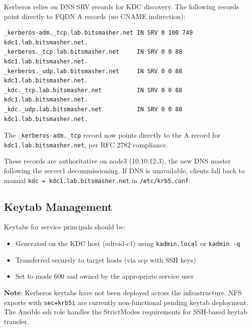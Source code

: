 Kerberos relies on DNS SRV records for KDC discovery. The following records point directly to FQDN A records (no CNAME indirection):

\begin{lstlisting}[style=mystyle]
_kerberos-adm._tcp.lab.bitsmasher.net IN SRV 0 100 749 kdc1.lab.bitsmasher.net.
_kerberos._tcp.lab.bitsmasher.net     IN SRV 0 0 88  kdc1.lab.bitsmasher.net.
_kerberos._udp.lab.bitsmasher.net     IN SRV 0 0 88  kdc1.lab.bitsmasher.net.
_kdc._tcp.lab.bitsmasher.net          IN SRV 0 0 88  kdc1.lab.bitsmasher.net.
_kdc._udp.lab.bitsmasher.net          IN SRV 0 0 88  kdc1.lab.bitsmasher.net.
    \end{lstlisting}

The \texttt{_kerberos-adm.\_tcp} record now points directly to the A record for \texttt{kdc1.lab.bitsmasher.net}, per RFC 2782 compliance.

These records are authoritative on node3 (10.10.12.3), the new DNS master following the server1 decommissioning. If DNS is unavailable, clients fall back to manual \texttt{kdc = kdc1.lab.bitsmasher.net} in \texttt{/etc/krb5.conf}.

\subsection{Keytab Management}

Keytabs for service principals should be:
\begin{itemize}
    \item Generated on the KDC host (odroid-c1) using \texttt{kadmin.local} or \texttt{kadmin -q}
    \item Transferred securely to target hosts (via scp with SSH keys)
    \item Set to mode 600 and owned by the appropriate service user
\end{itemize}

\textbf{Note}: Kerberos keytabs have not been deployed across the infrastructure. NFS exports with \texttt{sec=krb5i} are currently non-functional pending keytab deployment. The Ansible ssh role handles the StrictModes requirements for SSH-based keytab transfer.
